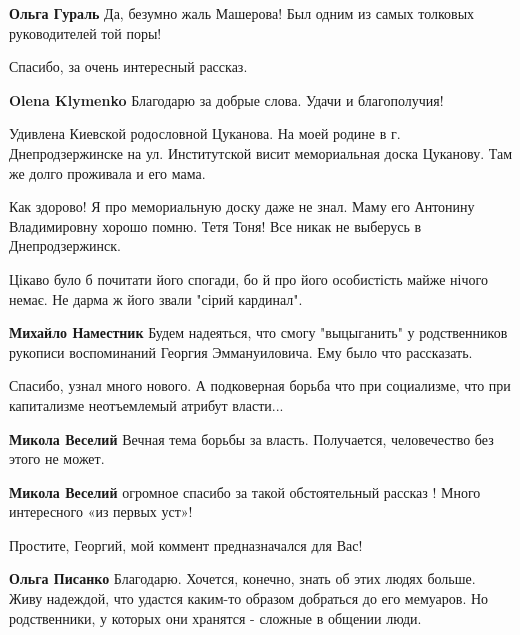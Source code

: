\begin{itemize}
\begin{itemize}
\begin{itemize} %
\textbf{Ольга Гураль} Да, безумно жаль Машерова! Был одним из самых толковых руководителей той поры!
\end{itemize} %

\end{itemize} %

Спасибо, за очень интересный рассказ.

\begin{itemize} %
\textbf{Olena Klymenko} Благодарю за добрые слова. Удачи и благополучия!
\end{itemize} %


Удивлена Киевской родословной Цуканова. На моей родине в г. Днепродзержинске на
ул. Институтской висит мемориальная доска Цуканову. Там же долго проживала и его
мама.


Как здорово! Я про мемориальную доску даже не знал. Маму его Антонину
Владимировну хорошо помню. Тетя Тоня! Все никак не выберусь в Днепродзержинск.


Цікаво було б почитати його спогади, бо й про його особистість майже нічого немає. Не дарма ж його звали "сірий кардинал".

\begin{itemize} %
\textbf{Михайло Наместник} Будем надеяться, что смогу "выцыганить" у родственников рукописи воспоминаний Георгия Эммануиловича. Ему было что рассказать.
\end{itemize} %

Спасибо, узнал много нового. А подковерная борьба что при социализме, что при капитализме неотъемлемый атрибут власти...

\begin{itemize} %
\textbf{Микола Веселий} Вечная тема борьбы за власть. Получается, человечество без этого не может.

\textbf{Микола Веселий} огромное спасибо за такой обстоятельный рассказ ! Много интересного «из первых уст»!

\begin{itemize} %
Простите, Георгий, мой коммент предназначался для Вас!

\textbf{Ольга Писанко} Благодарю. Хочется, конечно, знать об этих людях больше. Живу надеждой, что удастся каким-то образом добраться до его мемуаров. Но родственники, у которых они хранятся - сложные в общении люди.


\end{itemize}
\end{itemize}
\end{itemize}
